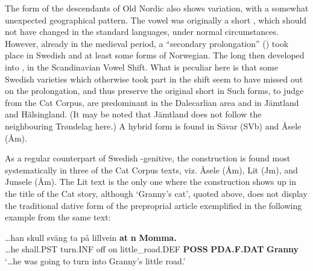 
The form of the descendants of Old Nordic  also shows variation, with a somewhat unexpected geographical pattern. The vowel was originally a short , which should not have changed in the standard languages, under normal circumstances. However, already in the medieval period, a “secondary prolongation” (\citet[1204]{Hellquist1922}) took place in Swedish and at least some forms of Norwegian. The long  then developed into , in the Scandinavian Vowel Shift. What is peculiar here is that some Swedish varieties which otherwise took part in the   shift seem to have missed out on the prolongation, and thus preserve the original short in Such forms, to judge from the Cat Corpus, are predominant in the Dalecarlian area and in Jämtland and Hälsingland. (It may be noted that Jämtland does not follow the neighbouring Trøndelag here.) A hybrid form  is found in Sävar (SVb) and Åsele (Åm). 


As a regular counterpart of Swedish -genitive, the  construction is\textit{ }found most systematically in three of the Cat Corpus texts, viz. Åsele (Åm), Lit (Jm), and Junsele (Åm). The Lit text is the only one where the  construction shows up in the title of the Cat story, although ‘Granny’s cat’, quoted above, does not display the traditional dative form  of the preproprial article exemplified in the following example from the same text:


\ea\label{}
\gll …han  skull  sväng  ta  på  lillvein  \textbf{at} \textbf{n} \textbf{Momma.}\\
…he  shall.PST  turn.INF  off  on  little\_road.DEF  \textbf{POSS} \textbf{PDA.F.DAT} \textbf{Granny}\\
\glt ‘…he was going to turn into Granny’s little road.’
\z

